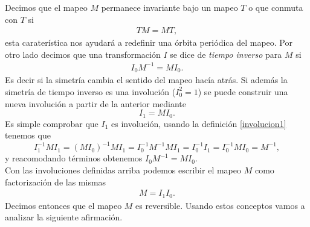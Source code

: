 Decimos que el mapeo $M$ permanece invariante bajo un mapeo $T$ o que conmuta con $T$ si 
\begin{eqnarray}
TM = MT,
\label{conmuta}
\end{eqnarray}
esta carater\'istica nos ayudar\'a a redefinir una \'orbita peri\'odica del mapeo. Por otro lado decimos que una transformaci\'on $I$ se dice de \textit{tiempo inverso} para $M$ si 
\begin{eqnarray}
I_{0}M^{-1} = MI_{0}.
\label{involucion1}
\end{eqnarray}
Es decir si la simetr\'ia cambia el sentido del mapeo hac\'ia atr\'as. Si adem\'as la simetr\'ia de tiempo inverso es una involuci\'on ($I_{0}^{2}=1$) se puede construir una nueva involuci\'on a partir de la anterior mediante 
\begin{equation}
I_{1} = MI_{0}.
\label{involucion2}
\end{equation}
Es simple comprobar que $I_{1}$ es involuci\'on, usando la definici\'on \ref{involucion1} tenemos que 
\begin{equation*}
I_{1}^{-1}MI_{1} = (MI_{0})^{-1}MI_{1} = I_{0}^{-1}M^{-1}MI_{1} = I_{0}^{-1}I_{1} = I^{-1}_{0}MI_{0}=M^{-1},
\end{equation*}
y reacomodando t\'erminos obtenemos $I_{0}M^{-1}= MI_{0}$.\\

 
Con las involuciones definidas arriba podemos escribir el mapeo $M$ como factorizaci\'on de las mismas
\begin{eqnarray}
M = I_{1}I_{0}.
\end{eqnarray}
Decimos entonces que el mapeo $M$ es reversible. Usando estos conceptos vamos a analizar la siguiente afirmaci\'on. \\

